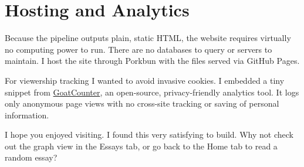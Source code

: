 \documentclass{article}
\begin{document}
\section*{Hosting and Analytics}
Because the pipeline outputs plain, static HTML, the website requires virtually no computing power to run. There are no databases to query or servers to maintain. I host the site through Porkbun with the files served via GitHub Pages.

For viewership tracking I wanted to avoid invasive cookies. I embedded a tiny snippet from \href{https://www.goatcounter.com}{GoatCounter}, an open-source, privacy-friendly analytics tool. It logs only anonymous page views with no cross-site tracking or saving of personal information.

I hope you enjoyed visiting. I found this very satisfying to build. Why not check out the graph view in the Essays tab, or go back to the Home tab to read a random essay?
\end{document}
